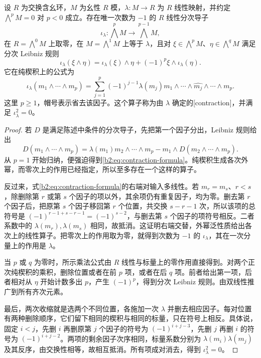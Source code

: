 \begin{proposition}[收缩微分]\label{b2:prop:exterior-contraction}
	设 \(R\) 为交换含幺环，\(M\) 为幺性 \(R\) 模，\(\lambda:M\to R\) 为 \(R\) 线性映射，并约定 \(\bigwedge^pM=0\) 对 \(p<0\) 成立。存在唯一次数为 \(-1\) 的 \(R\) 线性分次导子
	\[
		\iota_\lambda:\bigwedge^pM\longrightarrow\bigwedge^{p-1}M,
	\]
	在 \(R=\bigwedge^0M\) 上取零，在 \(M=\bigwedge^1M\) 上等于 \(\lambda\)，且对 \(\xi\in\bigwedge^pM\)、\(\eta\in\bigwedge^qM\) 满足分次 Leibniz 规则
	\[
		\iota_\lambda(\xi\wedge\eta) =\iota_\lambda(\xi)\wedge\eta+(-1)^p\xi\wedge\iota_\lambda(\eta).
	\]
	它在纯楔积上的公式为
	\begin{equation}\label{b2:eq:contraction-formula}
		\iota_\lambda(m_1\wedge\cdots\wedge m_p) =\sum_{j=1}^p(-1)^{j-1}\lambda(m_j) m_1\wedge\cdots\wedge\widehat{m_j}\wedge\cdots\wedge m_p.
	\end{equation}
	这里 \(p\ge1\)，帽号表示省去该因子。这个算子称为由 \(\lambda\) 确定的[contraction]，并满足 \(\iota_\lambda^2=0\)。
\end{proposition}
\begin{proof}
	若 \(D\) 是满足陈述中条件的分次导子，先把第一个因子分出，Leibniz 规则给出
	\[
		D(m_1\wedge\cdots\wedge m_p) =\lambda(m_1)m_2\wedge\cdots\wedge m_p -m_1\wedge D(m_2\wedge\cdots\wedge m_p).
	\]
	从 \(p=1\) 开始归纳，便强迫得到\eqref{b2:eq:contraction-formula}。纯楔积生成各次外幂，而零次上的作用已经指定，所以至多存在一个这样的算子。

	反过来，式\eqref{b2:eq:contraction-formula}的右端对输入多线性。若 \(m_r=m_s\)、\(r<s\)，除删除第 \(r\) 或第 \(s\) 个因子的项以外，其余项仍有重复因子，均为零。删去第 \(r\) 个因子后，把原第 \(s\) 个因子移回第 \(r\) 个位置，共交换 \(s-r-1\) 次，所以该项的总符号是 \((-1)^{r-1+s-r-1}=(-1)^{s-2}\)，与删去第 \(s\) 个因子的项符号相反。二者系数中的 \(\lambda(m_r),\lambda(m_s)\) 相同，故抵消。这证明右端交替，外幂泛性质给出各次上的线性算子。把零次上的作用取为零，就得到次数为 \(-1\) 的 \(\iota_\lambda\)，其在一次分量上的作用是 \(\lambda\)。

	当 \(p\) 或 \(q\) 为零时，所示乘法公式由 \(R\) 线性与标量上的零作用直接得到。对两个正次纯楔积的乘积，删除位置或者在前 \(p\) 项，或者在后 \(q\) 项。前者给出第一项，后者相对从 \(\eta\) 开始计数多出 \(p\)，产生 \((-1)^p\)，得到分次 Leibniz 规则。由双线性推广到所有齐次元素。

	最后，两次收缩就是选两个不同位置，各施加一次 \(\lambda\) 并删去相应因子。每对位置有两种删除顺序，它们留下相同的楔积与相同的标量，只在符号上相反。具体说，固定 \(i<j\)，先删 \(i\) 再删原第 \(j\) 个因子的符号为 \((-1)^{i+j-3}\)，先删 \(j\) 再删 \(i\) 的符号为 \((-1)^{i+j-2}\)。两项的剩余因子次序相同，标量系数分别为 \(\lambda(m_i)\lambda(m_j)\) 及其反序，由交换性相等，故相互抵消。所有项成对消去，得到 \(\iota_\lambda^2=0\)。
\end{proof}

